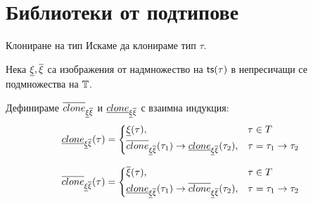 \documentclass[9pt]{beamer}
\begin{document}
  \section{Библиотеки от подтипове}
  \newcommand\clonesub{\subtyper{clone}_{\subtyper{\xi} \suptyper{\xi}}}
  \newcommand\clonesup{\suptyper{clone}_{\subtyper{\xi} \suptyper{\xi}}}

  \begin{frame}{Клониране на тип}
    Искаме да клонираме тип $\tau$.

    Нека $\underline{\xi}, \overline{\xi}$ са изображения от надмножество на
    $\mathsf{ts}(\tau)$ в непресичащи се подмножества на $\mathbb{T}$.

    Дефинираме
    $\overline{clone}_{\underline{\xi} \overline{\xi}}$ и
    $\underline{clone}_{\underline{\xi} \overline{\xi}}$ с взаимна индукция:
    \[
        \subtyper{clone}_{\subtyper{\xi} \suptyper{\xi}}(\tau) =
        \begin{cases*}
            \subtyper{\xi}(\tau) ,&
                $\tau \in T$ \\
            \suptyper{clone}_{\subtyper{\xi} \suptyper{\xi}}(\tau_1)
                \tot \subtyper{clone}_{\subtyper{\xi} \suptyper{\xi}}(\tau_2) ,&
                $\tau = \tau_1 \tot \tau_2$ \\
        \end{cases*}
    \]

    \[
        \suptyper{clone}_{\subtyper{\xi} \suptyper{\xi}}(\tau) =
        \begin{cases*}
            \suptyper{\xi}(\tau) ,&
                $\tau \in T$ \\
            \subtyper{clone}_{\subtyper{\xi} \suptyper{\xi}}(\tau_1)
                \tot \suptyper{clone}_{\subtyper{\xi} \suptyper{\xi}}(\tau_2) ,&
                $\tau = \tau_1 \tot \tau_2$ \\
        \end{cases*}
    \]
  \end{frame}
\end{document}
